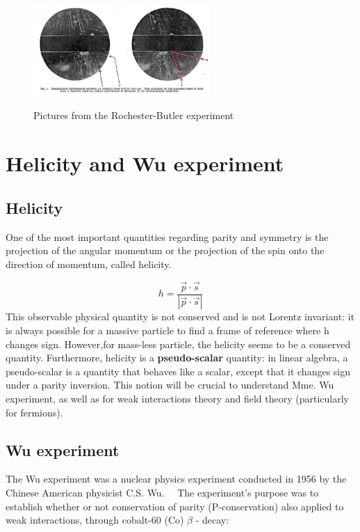 \begin{figure}[!h]
    \centering
    \includegraphics[width=0.6\textwidth]{Figures/FNSN27_5.JPG}
    \label{fig:roc1}
    \caption{Pictures from the Rochester-Butler experiment}
\end{figure} 


\section{Helicity and Wu experiment}
\subsection{Helicity}

One of the most important quantities regarding parity and symmetry is the projection of the angular momentum or the projection of the spin onto the direction of momentum, called helicity.

\[h = \frac{\vec{p}\cdot \vec{s}}{|\vec{p}\cdot \vec{s}|}  \]
This observable physical quantity is not conserved and is not Lorentz invariant: it is always possible for a massive particle to find a frame of reference where h changes sign.
However,for mass-less particle, the helicity seems to be a conserved quantity.
Furthermore, helicity is a \textbf{pseudo-scalar} quantity: in linear algebra, a pseudo-scalar is a quantity that behaves like a scalar, except that it changes sign under a parity inversion.
This notion will be crucial to understand Mme. Wu experiment, as well as for weak interactions theory and field theory (particularly for fermions).

\subsection{Wu experiment}

The Wu experiment was a nuclear physics experiment conducted in 1956 by the Chinese American physicist C.S. Wu. \ \
The experiment's purpose was to establish whether or not conservation of parity (P-conservation) also applied to weak interactions, through cobalt-60 (Co) $\beta$ - decay:

